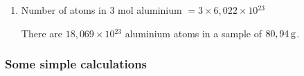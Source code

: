 {\begin{mdframed}[linewidth=4, leftmargin=40, rightmargin=40]
\begin{exercise}
\begin{enumerate}[noitemsep, label=\textbf{Step} \textbf{\arabic*}. ]
      
      \item  
      \label{m38717*id278019}Number of atoms in 3 mol aluminium \begin{math}=3\ensuremath{\times}6,022\ensuremath{\times}10{}^{23}\end{math}\par 
      \label{m38717*id278053}There are \begin{math}18,069\ensuremath{\times}10{}^{23}\end{math} aluminium atoms in a sample of \begin{math}80,94\phantom{\rule{2pt}{0ex}}\mathrm{g}\end{math}.\par 
 \end{enumerate}
         

    \end{exercise}
    \end{mdframed}
    }
    \noindent
  
\label{m38717*secfhsst!!!underscore!!!id539}
            \subsubsection{  Some simple calculations
      }
            \nopagebreak
            

